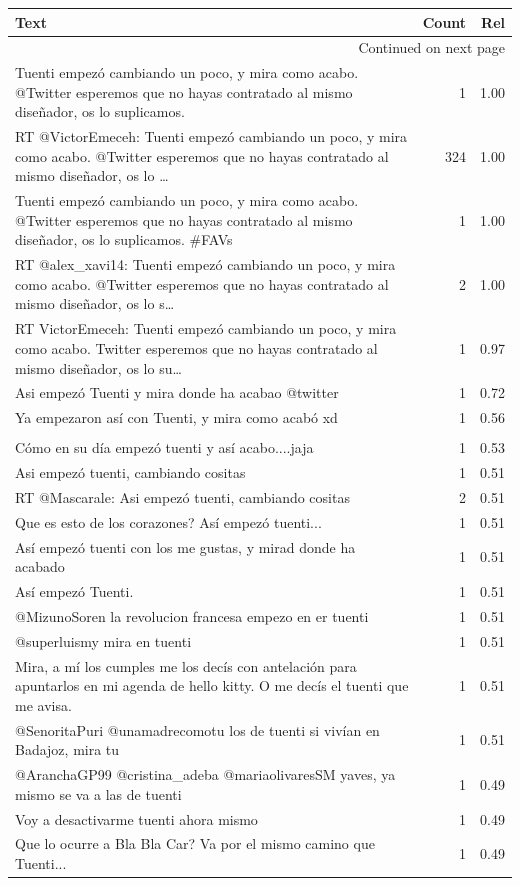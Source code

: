 \begin{longtable}{p{12.5cm}rr}
\toprule
Text & Count & Rel \\
\midrule
\endhead
\midrule
\multicolumn{3}{r}{{Continued on next page}} \\
\midrule
\endfoot

\bottomrule
\endlastfoot
Tuenti empezó cambiando un poco, y mira como acabo. @Twitter esperemos que no hayas contratado al mismo diseñador, os lo suplicamos. & 1 & 1.00 \\
RT @VictorEmeceh: Tuenti empezó cambiando un poco, y mira como acabo. @Twitter esperemos que no hayas contratado al mismo diseñador, os lo … & 324 & 1.00 \\
Tuenti empezó cambiando un poco, y mira como acabo. @Twitter esperemos que no hayas contratado al mismo diseñador, os lo suplicamos. \#FAVs & 1 & 1.00 \\
RT @alex\_xavi14: Tuenti empezó cambiando un poco, y mira como acabo. @Twitter esperemos que no hayas contratado al mismo diseñador, os lo s… & 2 & 1.00 \\
RT VictorEmeceh: Tuenti empezó cambiando un poco, y mira como acabo. Twitter esperemos que no hayas contratado al mismo diseñador, os lo su… & 1 & 0.97 \\
Asi empezó Tuenti y mira donde ha acabao @twitter & 1 & 0.72 \\
Ya empezaron así con Tuenti, y mira como acabó xd & 1 & 0.56 \\
\begin{tabular}[c]{@{}l@{}}Nooo twiter esta empezando a copiar a Facebook  \\ Cómo en su día empezó tuenti y así acabo....jaja\end{tabular} & 1 & 0.53 \\
Asi empezó tuenti, cambiando cositas & 1 & 0.51 \\
RT @Mascarale: Asi empezó tuenti, cambiando cositas & 2 & 0.51 \\
Que es esto de los corazones? Así empezó tuenti... & 1 & 0.51 \\
Así empezó tuenti con los me gustas, y mirad donde ha acabado & 1 & 0.51 \\
Así empezó Tuenti. & 1 & 0.51 \\
@MizunoSoren la revolucion francesa empezo en er tuenti & 1 & 0.51 \\
@superluismy mira en tuenti & 1 & 0.51 \\
Mira, a mí los cumples me los decís con antelación para apuntarlos en mi agenda de hello kitty. O me decís el tuenti que me avisa. & 1 & 0.51 \\
@SenoritaPuri @unamadrecomotu los de tuenti si vivían en Badajoz, mira tu & 1 & 0.51 \\
@AranchaGP99 @cristina\_adeba @mariaolivaresSM yaves, ya mismo se va a las de tuenti & 1 & 0.49 \\
Voy a desactivarme tuenti ahora mismo & 1 & 0.49 \\
Que lo ocurre a Bla Bla Car? Va por el mismo camino que Tuenti... & 1 & 0.49 \\

\end{longtable}
\clearpage

